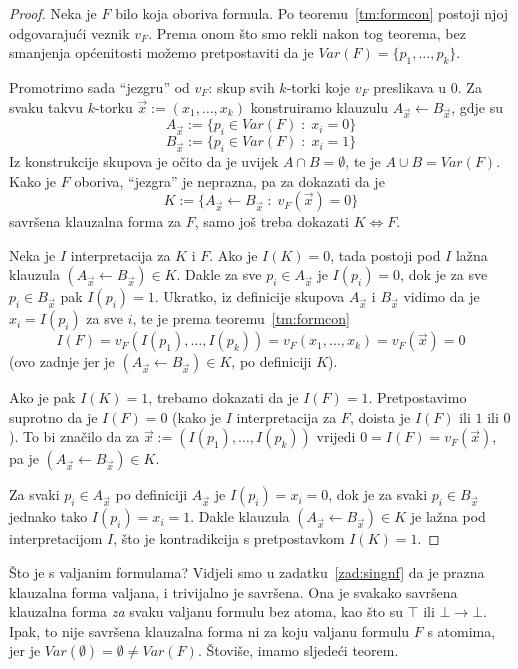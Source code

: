 \begin{proof}
Neka je $F$ bilo koja oboriva formula. Po teoremu~\ref{tm:formcon} postoji njoj odgovarajući veznik $v_F$. Prema onom što smo rekli nakon tog teorema, bez smanjenja općenitosti možemo pretpostaviti da je $Var(F)=\{p_1,\ldots,p_k\}$.

Promotrimo sada ``jezgru'' od $v_F$: skup svih $k$-torki koje $v_F$ preslikava u $0$. Za svaku takvu $k$-torku $\vec x:=(x_1,\ldots,x_k)$ konstruiramo klauzulu $A_{\vec x}\leftarrow B_{\vec x}$, gdje su
$$A_{\vec x}:=\{p_i\in Var(F)\;:\;x_i=0\}$$
$$B_{\vec x}:=\{p_i\in Var(F)\;:\;x_i=1\}$$
Iz konstrukcije skupova je očito da je uvijek $A\cap B=\emptyset$, te je $A\cup B=Var(F)$. Kako je $F$ oboriva, ``jezgra'' je neprazna, pa za dokazati da je
$$K:=\{A_{\vec x}\leftarrow B_{\vec x}\;:\;v_F(\vec x)=0\}$$
savršena klauzalna forma za $F$, samo još treba dokazati $K\Leftrightarrow F$.

Neka je $I$ interpretacija za $K$ i $F$. Ako je $I(K)=0$, tada postoji pod $I$ lažna klauzula $(A_{\vec x}\leftarrow B_{\vec x})\in K$. Dakle za sve $p_i\in A_{\vec x}$ je $I(p_i)=0$, dok je za sve $p_i\in B_{\vec x}$ pak $I(p_i)=1$. Ukratko, iz definicije skupova $A_{\vec x}$ i $B_{\vec x}$ vidimo da je $x_i=I(p_i)$ za sve $i$, te je prema teoremu~\ref{tm:formcon}
$$I(F)=v_F(I(p_1),\ldots,I(p_k))=v_F(x_1,\ldots,x_k)=v_F(\vec x)=0$$
(ovo zadnje jer je $(A_{\vec x}\leftarrow B_{\vec x})\in K$, po definiciji $K$).

Ako je pak $I(K)=1$, trebamo dokazati da je $I(F)=1$. Pretpostavimo suprotno da je $I(F)=0$ (kako je $I$ interpretacija za $F$, doista je $I(F)$ ili $1$ ili $0$). To bi značilo da za $\vec x:=(I(p_1),\ldots,I(p_k))$ vrijedi $0=I(F)=v_F(\vec x)$, pa je $(A_{\vec x}\leftarrow B_{\vec x})\in K$.

Za svaki $p_i\in A_{\vec x}$ po definiciji $A_{\vec x}$ je $I(p_i)=x_i=0$, dok je za svaki $p_i\in B_{\vec x}$ jednako tako $I(p_i)=x_i=1$. Dakle klauzula $(A_{\vec x}\leftarrow B_{\vec x})\in K$ je lažna pod interpretacijom $I$, što je kontradikcija s pretpostavkom $I(K)=1$.
\end{proof}

Što je s valjanim formulama? Vidjeli smo u zadatku~\ref{zad:singnf} da je prazna klauzalna forma valjana, i trivijalno je savršena. Ona je svakako savršena klauzalna forma \emph{za} svaku valjanu formulu bez atoma, kao što su $\top$ ili $\bot\to\bot$. Ipak, to nije savršena klauzalna forma ni za koju valjanu formulu $F$ s atomima, jer je $Var(\emptyset)=\emptyset\not=Var(F)$. Štoviše, imamo sljedeći teorem.

